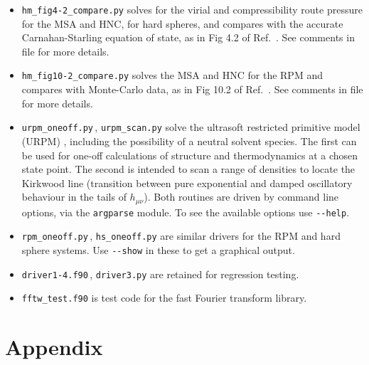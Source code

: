 \documentclass[12pt,a4paper]{article}
\newcommand{\Refcite}[1]{Ref.~\cite{#1}}
\begin{document}
\begin{itemize}
%
\item\verb+hm_fig4-2_compare.py+ solves for the virial and
  compressibility route pressure for the MSA and HNC, for hard
  spheres, and compares with the accurate Carnahan-Starling equation of
  state, as in Fig 4.2 of \Refcite{HM06}.  See comments in file for
  more details.
%
\item\verb+hm_fig10-2_compare.py+ solves the MSA and HNC for the
  RPM and compares with Monte-Carlo data, as in Fig 10.2 of
  \Refcite{HM06}.  See comments in file for more details.
%
\item\verb+urpm_oneoff.py+\,, \verb+urpm_scan.py+ solve the ultrasoft
  restricted primitive model (URPM) \cite{WVA+13}, including the
  possibility of a neutral solvent species.  The first can be
  used for one-off calculations of structure and thermodynamics at a
  chosen state point.  The second is intended to scan a range
  of densities to locate the Kirkwood line (transition between pure
  exponential and damped oscillatory behaviour in the tails of
  $h_{\mu\nu}$).  Both routines are driven by command line options,
  via the \verb+argparse+ module.  To see the available options use
  \verb+--help+.
%
\item\verb+rpm_oneoff.py+\,, \verb+hs_oneoff.py+ are similar drivers
  for the RPM and hard sphere systems.  Use \verb+--show+ in these to
  get a graphical output.
%
\item \verb+driver1-4.f90+\,, \verb+driver3.py+ are retained
  for regression testing.
%
\item \verb+fftw_test.f90+ is test code for the fast Fourier transform library.
%
\end{itemize}

\appendix
%
\section{Appendix}
%
\end{document}
